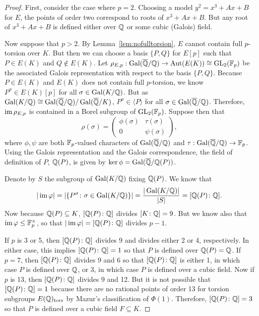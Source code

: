 \begin{proof} 
First, consider the case where $p= 2$. Choosing a model $y^2= x^3+Ax+B$ for $E$, the points of order two correspond to roots of $x^3+Ax+B$. But any root of $x^3+Ax+B$ is defined either over $\mathbb{Q}$ or some cubic (Galois) field. 

Now suppose that $p > 2$. By Lemma~\ref{lem:nofulltorsion}, $E$ cannot contain full $p$-torsion over $K$. But then we can choose a basis $\{ P, Q \}$ for $E[p]$ such that $P \in E(K)$ and $Q \notin E(K)$. Let $\rho_{E,p}: \operatorname{Gal}(\overline{\mathbb{Q}}/\mathbb{Q}) \to \operatorname{Aut}(E(K)) \cong \operatorname{GL}_2(\mathbb{F}_p)$ be the associated Galois representation with respect to the basis $\{ P, Q \}$. Because $P \in E(K)$ and $E(K)$ does not contain full $p$-torsion, we know $P^\sigma \in E(K)[p]$ for all $\sigma \in \operatorname{Gal}(K/\mathbb{Q})$. But as $\operatorname{Gal}(K/\mathbb{Q}) \cong \operatorname{Gal}(\overline{\mathbb{Q}}/\mathbb{Q})/\operatorname{Gal}(\overline{\mathbb{Q}}/K)$, $P^\sigma \in \langle P \rangle$ for all $\sigma \in \operatorname{Gal}(\overline{\mathbb{Q}}/\mathbb{Q})$. Therefore, $\operatorname{im} \rho_{E,p}$ is contained in a Borel subgroup of $\operatorname{GL}_2(\mathbb{F}_p)$. Suppose then that
	\[
	\rho(\sigma)=
	\begin{pmatrix}
	\phi(\sigma) & \tau(\sigma) \\
	0 & \psi(\sigma)
	\end{pmatrix},
	\]
where $\phi, \psi$ are both $\mathbb{F}_p$-valued characters of $\operatorname{Gal}(\overline{\mathbb{Q}}/\mathbb{Q})$ and $\tau: \operatorname{Gal}(\overline{\mathbb{Q}}/\mathbb{Q}) \to \mathbb{F}_p$. Using the Galois representation and the Galois correspondence, the field of definition of $P$, $\mathbb{Q}(P)$, is given by $\ker \phi= \operatorname{Gal}(\overline{\mathbb{Q}}/\mathbb{Q}(P))$. 

Denote by $S$ the subgroup  of $\operatorname{Gal}(K/\mathbb{Q})$ fixing $\mathbb{Q}(P)$. We know that 
	\[
	|\operatorname{im} \varphi|= |\{ P^\sigma \colon \sigma \in \operatorname{Gal}(K/\mathbb{Q}) \}| = \dfrac{|\operatorname{Gal}(K/\mathbb{Q})|}{|S|}= [\mathbb{Q}(P) \colon \mathbb{Q}].
	\]
Now because $\mathbb{Q}(P) \subseteq K$, $[\mathbb{Q}(P) \colon \mathbb{Q}]$ divides $[K \colon \mathbb{Q}]= 9$. But we know also that $\operatorname{im} \varphi \leq \mathbb{F}_p^\times$, so that $|\operatorname{im} \varphi|= [\mathbb{Q}(P) \colon \mathbb{Q}]$ divides $p - 1$. 

If $p$ is 3 or 5, then $[\mathbb{Q}(P) \colon \mathbb{Q}]$ divides 9 and divides either 2 or 4, respectively. In either case, this implies $[\mathbb{Q}(P) \colon \mathbb{Q}]= 1$ so that $P$ is defined over $\mathbb{Q}(P)= \mathbb{Q}$. If $p= 7$, then $[\mathbb{Q}(P) \colon \mathbb{Q}]$ divides 9 and 6 so that $[\mathbb{Q}(P) \colon \mathbb{Q}]$ is either 1, in which case $P$ is defined over $\mathbb{Q}$, or 3, in which case $P$ is defined over a cubic field. Now if $p$ is 13, then $[\mathbb{Q}(P) \colon \mathbb{Q}]$ divides 9 and 12. But it is not possible that $[\mathbb{Q}(P) \colon \mathbb{Q}]= 1$ because there are no rational points of order 13 for torsion subgroups $E(\mathbb{Q})_{\text{tors}}$ by Mazur's classification of $\Phi(1)$. Therefore, $[\mathbb{Q}(P) \colon \mathbb{Q}]= 3$ so that $P$ is defined over a cubic field $F \subseteq K$. 
\end{proof} 


